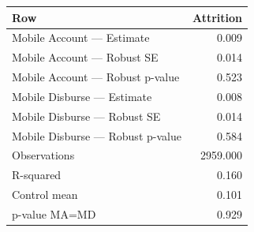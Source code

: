 
\begin{tabular}{lr}
\toprule
Row & Attrition\\
\midrule
Mobile Account — Estimate & 0.009\\
Mobile Account — Robust SE & 0.014\\
Mobile Account — Robust p-value & 0.523\\
Mobile Disburse — Estimate & 0.008\\
Mobile Disburse — Robust SE & 0.014\\
\addlinespace
Mobile Disburse — Robust p-value & 0.584\\
Observations & 2959.000\\
R-squared & 0.160\\
Control mean & 0.101\\
p-value MA=MD & 0.929\\
\bottomrule
\end{tabular}

